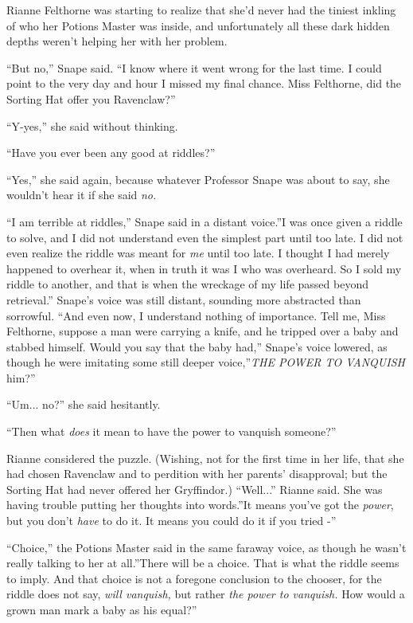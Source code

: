 Rianne Felthorne was starting to realize that she'd never had the
tiniest inkling of who her Potions Master was inside, and unfortunately
all these dark hidden depths weren't helping her with her problem.

``But no,'' Snape said. ``I know where it went wrong for the last time.
I could point to the very day and hour I missed my final chance. Miss
Felthorne, did the Sorting Hat offer you Ravenclaw?''

``Y-yes,'' she said without thinking.

``Have you ever been any good at riddles?''

``Yes,'' she said again, because whatever Professor Snape was about to
say, she wouldn't hear it if she said \emph{no.}

``I am terrible at riddles,'' Snape said in a distant voice.''I was once
given a riddle to solve, and I did not understand even the simplest part
until too late. I did not even realize the riddle was meant for
\emph{me} until too late. I thought I had merely happened to overhear
it, when in truth it was I who was overheard. So I sold my riddle to
another, and that is when the wreckage of my life passed beyond
retrieval.'' Snape's voice was still distant, sounding more abstracted
than sorrowful. ``And even now, I understand nothing of importance. Tell
me, Miss Felthorne, suppose a man were carrying a knife, and he tripped
over a baby and stabbed himself. Would you say that the baby had,''
Snape's voice lowered, as though he were imitating some still deeper
voice,''\emph{THE POWER TO VANQUISH} him?''

``Um... no?'' she said hesitantly.

``Then what \emph{does} it mean to have the power to vanquish someone?''

Rianne considered the puzzle. (Wishing, not for the first time in her
life, that she had chosen Ravenclaw and to perdition with her parents'
disapproval; but the Sorting Hat had never offered her Gryffindor.)
``Well...'' Rianne said. She was having trouble putting her
thoughts into words.''It means you've got the \emph{power}, but you
don't \emph{have} to do it. It means you could do it if you tried -''

``Choice,'' the Potions Master said in the same faraway voice, as though
he wasn't really talking to her at all.''There will be a choice. That is
what the riddle seems to imply. And that choice is not a foregone
conclusion to the chooser, for the riddle does not say, \emph{will
vanquish,} but rather \emph{the power to vanquish.} How would a grown
man mark a baby as his equal?''

